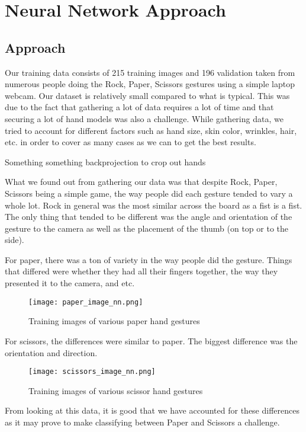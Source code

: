 \section{Neural Network Approach}
\label{neural_network}

\subsection{Approach}

Our training data consists of 215 training images and 196 validation taken from numerous people doing the Rock, Paper, Scissors gestures using a simple laptop webcam. Our dataset is relatively small compared to what is typical. This was due to the fact that gathering a lot of data requires a lot of time and that securing a lot of hand models was also a challenge. While gathering data, we tried to account for different factors such as hand size, skin color, wrinkles, hair, etc. in order to cover as many cases as we can to get the best results.

Something something backprojection to crop out hands

What we found out from gathering our data was that despite Rock, Paper, Scissors being a simple game, the way people did each gesture tended to vary a whole lot. Rock in general was the most similar across the board as a fist is a fist. The only thing that tended to be different was the angle and orientation of the gesture to the camera as well as the placement of the thumb (on top or to the side).

For paper, there was a ton of variety in the way people did the gesture. Things that differed were whether they had all their fingers together, the way they presented it to the camera, and etc.

\begin{figure}[h]
\texttt{[image: paper\_image\_nn.png]}
\centering
\caption{Training images of various paper hand gestures}
\end{figure}

For scissors, the differences were similar to paper. The biggest difference was the orientation and direction.

\begin{figure}[h]
\texttt{[image: scissors\_image\_nn.png]}
\centering
\caption{Training images of various scissor hand gestures}
\end{figure}

From looking at this data, it is good that we have accounted for these differences as it may prove to make classifying between Paper and Scissors a challenge.
